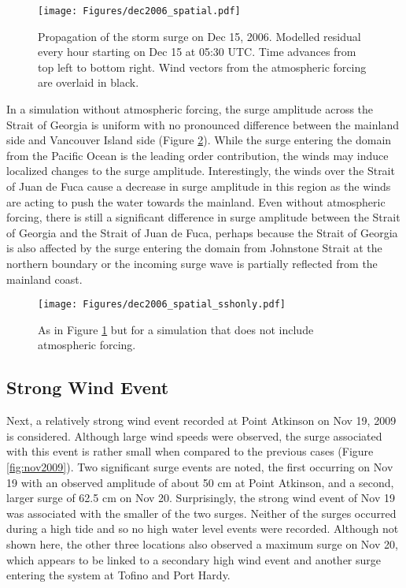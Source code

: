 \documentclass{tATO2e}
\begin{document}
\begin{figure}
\centering
\texttt{[image: Figures/dec2006\_spatial.pdf]}
\caption{Propagation of the storm surge on Dec 15, 2006. Modelled residual every hour starting on Dec 15 at 05:30 UTC. Time advances from top left to bottom right. Wind vectors from the atmospheric forcing are overlaid in black.}
\label{fig:spatial}
\end{figure}

In a simulation without atmospheric forcing, the surge amplitude across the Strait of Georgia is uniform with no pronounced difference between the mainland side and Vancouver Island side (Figure \ref{fig:spatial_sshonly}). While the surge entering the domain from the Pacific Ocean is the leading order contribution, the winds may induce localized changes to the surge amplitude. Interestingly, the winds over the Strait of Juan de Fuca cause a decrease in surge amplitude in this region as the winds are acting to push the water towards the mainland.  Even without atmospheric forcing, there is still a significant difference in surge amplitude between the Strait of Georgia and the Strait of Juan de Fuca, perhaps because the Strait of Georgia is also affected by the surge entering the domain from Johnstone Strait at the northern boundary or the incoming surge wave is partially reflected from the mainland coast. 

\begin{figure}
\centering
\texttt{[image: Figures/dec2006\_spatial\_sshonly.pdf]}
\caption{As in Figure \ref{fig:spatial} but for a simulation that does not include atmospheric forcing. }
\label{fig:spatial_sshonly}
\end{figure}

\subsection{Strong Wind Event}\label{sec:wind}
Next, a relatively strong wind event recorded at Point Atkinson on Nov 19, 2009 is considered. Although large wind speeds were observed, the surge associated with this event is rather small when compared to the previous cases (Figure \ref{fig:nov2009}). Two significant surge events are noted, the first occurring on Nov 19 with an observed amplitude of about 50 cm at Point Atkinson, and a second, larger surge of 62.5 cm on Nov 20. Surprisingly, the strong wind event of Nov 19 was associated with the smaller of the two surges. Neither of the surges occurred during a high tide and so no high water level events were recorded. Although not shown here, the other three locations also observed a maximum surge on Nov 20, which appears to be linked to a secondary high wind event and another surge entering the system at Tofino and Port Hardy. 
\end{document}
